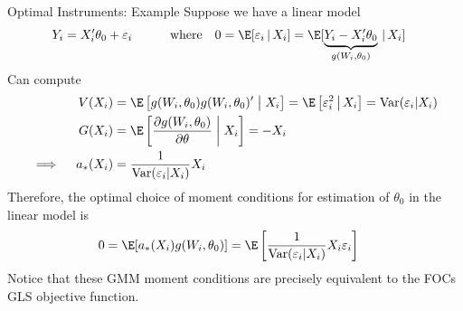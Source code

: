 \documentclass[aspectratio=169, handout]{beamer}
\newcommand{\Var}{\operatorname{Var}}
\begin{document}
{\footnotesize
\begin{frame}{Optimal Instruments: Example}
Suppose we have a linear model
\begin{align*}
  Y_i &= X_i'\theta_0 + \varepsilon_i
  \qquad
  \quad\text{where}\quad
  0 =
  \E[\varepsilon_i\,|\,X_i]
  =
  \E[
    \underbrace{%
      Y_i-X_i'\theta_0
    }_{g(W_i,\theta_0)}
    \,|\,X_i]
\end{align*}
Can compute
\begin{align*}
  V(X_i)
  &=
  \E\left[
    g(W_i,\theta_0)
    g(W_i,\theta_0)'
    \;\big|\;
    X_i
  \right]
  =
  \E\left[
    \varepsilon_i^2
    \,\big|\,
    X_i
  \right]
  =
  \Var(\varepsilon_i|X_i)
  \\
  G(X_i)
  &=
  \E\left[
    \frac{\partial g(W_i,\theta_0)}{\partial \theta}
    \;\bigg|\;
    X_i
  \right]
  =
  -X_i
  \\
  \implies\quad
  a_*(X_i)
  &=
  \frac{1}{\Var(\varepsilon_i|X_i)}
  X_i
\end{align*}
Therefore, the optimal choice of moment conditions for estimation of
$\theta_0$ in the linear model is
\begin{align*}
  0
  &=
  \E[a_*(X_i)g(W_i,\theta_0)]
  =
  \E\left[
    \frac{1}{\Var(\varepsilon_i|X_i)}
    X_i\varepsilon_i
  \right]
\end{align*}
Notice that these GMM moment conditions are precisely equivalent to the
FOCs \alert{GLS} objective function.
\end{frame}
}
\end{document}
